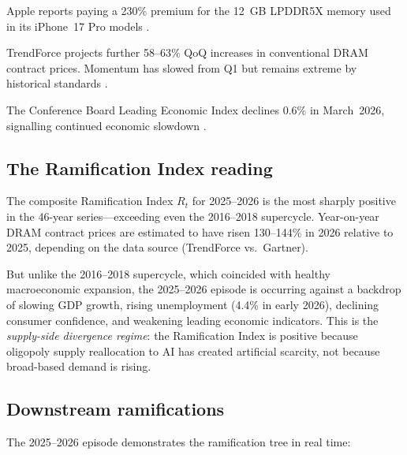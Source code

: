 \documentclass[12pt]{article}
\theoremstyle{definition}
\begin{document}
\begin{description}[itemsep=4pt]
\item[Q1 2026:] Apple reports paying a 230\% premium for the 12~GB LPDDR5X memory used in its iPhone~17 Pro models \cite{ColdFusion2026}. 

\item[Q2 2026:] TrendForce projects further 58--63\% QoQ increases in conventional DRAM contract prices. Momentum has slowed from Q1 but remains extreme by historical standards \cite{TrendForce2026Q2}.

\item[Q2 2026:] The Conference Board Leading Economic Index declines 0.6\% in March~2026, signalling continued economic slowdown \cite{ConferenceBoard2026}.
\end{description}

\subsection{The Ramification Index reading}

The composite Ramification Index $R_t$ for 2025--2026 is the most sharply positive in the 46-year series---exceeding even the 2016--2018 supercycle. Year-on-year DRAM contract prices are estimated to have risen 130--144\% in 2026 relative to 2025, depending on the data source (TrendForce vs.\ Gartner).

But unlike the 2016--2018 supercycle, which coincided with healthy macroeconomic expansion, the 2025--2026 episode is occurring against a backdrop of slowing GDP growth, rising unemployment (4.4\% in early 2026), declining consumer confidence, and weakening leading economic indicators. This is the \emph{supply-side divergence regime}: the Ramification Index is positive because oligopoly supply reallocation to AI has created artificial scarcity, not because broad-based demand is rising.

\subsection{Downstream ramifications}

The 2025--2026 episode demonstrates the ramification tree in real time:
\end{document}
